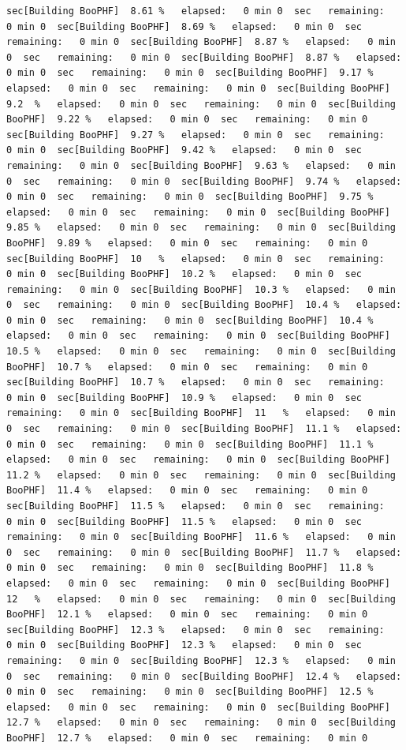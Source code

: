 \documentclass[
]{book}
\begin{document}
\begin{verbatim}
sec[Building BooPHF]  8.61 %   elapsed:   0 min 0  sec   remaining:   0 min 0  sec[Building BooPHF]  8.69 %   elapsed:   0 min 0  sec   remaining:   0 min 0  sec[Building BooPHF]  8.87 %   elapsed:   0 min 0  sec   remaining:   0 min 0  sec[Building BooPHF]  8.87 %   elapsed:   0 min 0  sec   remaining:   0 min 0  sec[Building BooPHF]  9.17 %   elapsed:   0 min 0  sec   remaining:   0 min 0  sec[Building BooPHF]  9.2  %   elapsed:   0 min 0  sec   remaining:   0 min 0  sec[Building BooPHF]  9.22 %   elapsed:   0 min 0  sec   remaining:   0 min 0  sec[Building BooPHF]  9.27 %   elapsed:   0 min 0  sec   remaining:   0 min 0  sec[Building BooPHF]  9.42 %   elapsed:   0 min 0  sec   remaining:   0 min 0  sec[Building BooPHF]  9.63 %   elapsed:   0 min 0  sec   remaining:   0 min 0  sec[Building BooPHF]  9.74 %   elapsed:   0 min 0  sec   remaining:   0 min 0  sec[Building BooPHF]  9.75 %   elapsed:   0 min 0  sec   remaining:   0 min 0  sec[Building BooPHF]  9.85 %   elapsed:   0 min 0  sec   remaining:   0 min 0  sec[Building BooPHF]  9.89 %   elapsed:   0 min 0  sec   remaining:   0 min 0  sec[Building BooPHF]  10   %   elapsed:   0 min 0  sec   remaining:   0 min 0  sec[Building BooPHF]  10.2 %   elapsed:   0 min 0  sec   remaining:   0 min 0  sec[Building BooPHF]  10.3 %   elapsed:   0 min 0  sec   remaining:   0 min 0  sec[Building BooPHF]  10.4 %   elapsed:   0 min 0  sec   remaining:   0 min 0  sec[Building BooPHF]  10.4 %   elapsed:   0 min 0  sec   remaining:   0 min 0  sec[Building BooPHF]  10.5 %   elapsed:   0 min 0  sec   remaining:   0 min 0  sec[Building BooPHF]  10.7 %   elapsed:   0 min 0  sec   remaining:   0 min 0  sec[Building BooPHF]  10.7 %   elapsed:   0 min 0  sec   remaining:   0 min 0  sec[Building BooPHF]  10.9 %   elapsed:   0 min 0  sec   remaining:   0 min 0  sec[Building BooPHF]  11   %   elapsed:   0 min 0  sec   remaining:   0 min 0  sec[Building BooPHF]  11.1 %   elapsed:   0 min 0  sec   remaining:   0 min 0  sec[Building BooPHF]  11.1 %   elapsed:   0 min 0  sec   remaining:   0 min 0  sec[Building BooPHF]  11.2 %   elapsed:   0 min 0  sec   remaining:   0 min 0  sec[Building BooPHF]  11.4 %   elapsed:   0 min 0  sec   remaining:   0 min 0  sec[Building BooPHF]  11.5 %   elapsed:   0 min 0  sec   remaining:   0 min 0  sec[Building BooPHF]  11.5 %   elapsed:   0 min 0  sec   remaining:   0 min 0  sec[Building BooPHF]  11.6 %   elapsed:   0 min 0  sec   remaining:   0 min 0  sec[Building BooPHF]  11.7 %   elapsed:   0 min 0  sec   remaining:   0 min 0  sec[Building BooPHF]  11.8 %   elapsed:   0 min 0  sec   remaining:   0 min 0  sec[Building BooPHF]  12   %   elapsed:   0 min 0  sec   remaining:   0 min 0  sec[Building BooPHF]  12.1 %   elapsed:   0 min 0  sec   remaining:   0 min 0  sec[Building BooPHF]  12.3 %   elapsed:   0 min 0  sec   remaining:   0 min 0  sec[Building BooPHF]  12.3 %   elapsed:   0 min 0  sec   remaining:   0 min 0  sec[Building BooPHF]  12.3 %   elapsed:   0 min 0  sec   remaining:   0 min 0  sec[Building BooPHF]  12.4 %   elapsed:   0 min 0  sec   remaining:   0 min 0  sec[Building BooPHF]  12.5 %   elapsed:   0 min 0  sec   remaining:   0 min 0  sec[Building BooPHF]  12.7 %   elapsed:   0 min 0  sec   remaining:   0 min 0  sec[Building BooPHF]  12.7 %   elapsed:   0 min 0  sec   remaining:   0 min 0  
\end{verbatim}
\end{document}

